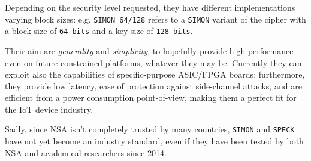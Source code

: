 Depending on the security level requested, they have different implementations varying block sizes:
e.g. \texttt{SIMON 64/128} refers to a \texttt{SIMON} variant of the cipher with a block size of \texttt{64 bits} and a key size of \texttt{128 bits}.

Their aim are \textit{generality} and \textit{simplicity},
to hopefully provide high performance even on future constrained platforms, whatever they may be.
Currently they can exploit also the capabilities of specific-purpose ASIC/FPGA boards;
furthermore, they provide low latency, ease of protection against side-channel attacks, and are efficient from a power consumption point-of-view,
making them a perfect fit for the IoT device industry.

Sadly, since NSA isn't completely trusted by many countries, \texttt{SIMON} and \texttt{SPECK} have not yet become an industry standard,
even if they have been tested by both NSA and academical researchers since 2014.